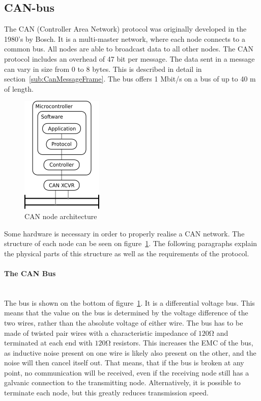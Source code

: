 
\subsection{CAN-bus}
The CAN (Controller Area Network) protocol was originally developed in the 1980's by Bosch.
It is a multi-master network, where each node connects to a common bus.
All nodes are able to broadcast data to all other nodes.
The CAN protocol includes an overhead of 47 bit per message.
The data sent in a message can vary in size from 0 to 8 bytes.
This is described in detail in section~\ref{sub:CanMessageFrame}.
The bus offers 1 Mbit/s on a bus of up to 40 \si{\metre} of length.

\begin{figure}[h!]
	\centering
	\includegraphics{graphics/canbus_setup}
	\caption{CAN node architecture}
	\label{fig:canbus_setup}
\end{figure}

Some hardware is necessary in order to properly realise a CAN network.
The structure of each node can be seen on figure~\ref{fig:canbus_setup}.
The following paragraphs explain the physical parts of this structure as well as the requirements of the protocol.

\paragraph*{The CAN Bus}~\\
The bus is shown on the bottom of figure~\ref{fig:canbus_setup}.
It is a differential voltage bus.
This means that the value on the bus is determined by the voltage difference of the two wires, rather than the absolute voltage of either wire.
The bus has to be made of twisted pair wires with a characteristic impedance of $\si{120 \ohm}$ and terminated at each end with $\si{120 \ohm}$ resistors.
This increases the EMC of the bus, as inductive noise present on one wire is likely also present on the other, and the noise will then cancel itself out.
That means, that if the bus is broken at any point, no communication will be received, even if the receiving node still has a galvanic connection to the transmitting node.
Alternatively, it is possible to terminate each node, but this greatly reduces transmission speed.\\


